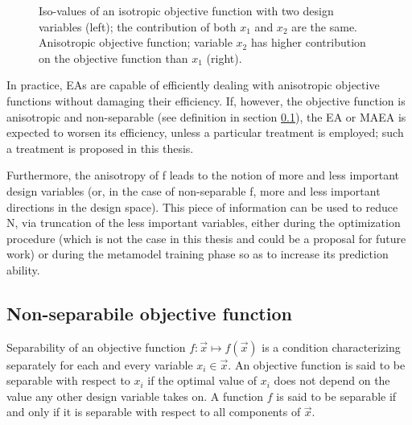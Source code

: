 \begin{figure}[h!]
\begin{minipage}[b]{1.0\linewidth}
 \centering
\end{minipage}
\caption{Iso-values of an isotropic objective function with two design variables (left); the contribution of both $x_1$ and $x_2$ are the same. Anisotropic objective function; variable $x_2$ has higher contribution on the objective function than $x_1$ (right).} 
\label{illc}
\end{figure}

In practice, EAs are capable of efficiently dealing with anisotropic objective functions without damaging their efficiency. If, however, the objective function is anisotropic and non-separable (see definition in section \ref{Nonsep}), the EA or MAEA is expected to worsen its efficiency, unless a particular treatment is employed; such a treatment is proposed in this thesis.  

Furthermore, the anisotropy of f leads to the notion of more and less important design variables (or, in the case of non-separable f, more and less important directions in the design space). This piece of information can be used to reduce N, via truncation of the less important variables, either during the optimization procedure (which is not the case in this thesis and could be a proposal for future work) or during the metamodel training phase so as to increase its prediction ability.       


\subsection{Non-separabile objective function}     
\label{Nonsep}
Separability of an objective function $f:\vec{x}\mapsto f(\vec{x})$ is a condition characterizing separately for each and every variable $x_i \in \vec{x}$. An objective function is said to be separable with respect to $x_i$ if the optimal value of $x_i$ does not depend on the value  any other design variable takes on. A function $f$ is said to be separable if and only if it is separable with respect to all components of $\vec{x}$.


